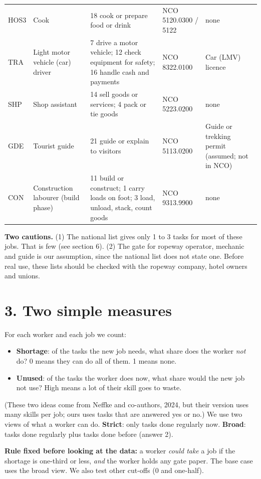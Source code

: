 \documentclass[11pt]{article}
\begin{document}
{\begin{longtable}{p{0.9cm}p{2.8cm}p{3.8cm}p{3.6cm}p{2.9cm}}
HOS3 & Cook & 18 cook or prepare food or drink & NCO 5120.0300 / 5122 & none \\
TRA & Light motor vehicle (car) driver & 7 drive a motor vehicle; 12 check equipment for safety; 16 handle cash and payments & NCO 8322.0100 & Car (LMV) licence \\
SHP & Shop assistant & 14 sell goods or services; 4 pack or tie goods & NCO 5223.0200 & none \\
GDE & Tourist guide & 21 guide or explain to visitors & NCO 5113.0200 & Guide or trekking permit (assumed; not in NCO) \\
CON & Construction labourer (build phase) & 11 build or construct; 1 carry loads on foot; 3 load, unload, stack, count goods & NCO 9313.9900 & none \\
\bottomrule
\end{longtable}
}

\textbf{Two cautions.} (1) The national list gives only 1 to 3 tasks for most of these jobs. That is few (see section 6). (2) The gate for ropeway operator, mechanic and guide is our assumption, since the national list does not state one.
Before real use, these lists should be checked with the ropeway company, hotel owners and unions.

\section*{3. Two simple measures}
For each worker and each job we count:
\begin{itemize}[leftmargin=1.2em,itemsep=2pt]
\item \textbf{Shortage}: of the tasks the new job needs, what share does the worker \emph{not} do? 0 means they can do all of them. 1 means none.
\item \textbf{Unused}: of the tasks the worker does now, what share would the new job not use? High means a lot of their skill goes to waste.
\end{itemize}
(These two ideas come from Neffke and co-authors, 2024, but their version uses many skills per job; ours uses tasks that are answered yes or no.)
We use two views of what a worker can do. \textbf{Strict}: only tasks done regularly now. \textbf{Broad}: tasks done regularly plus tasks done before (answer 2).

\textbf{Rule fixed before looking at the data:} a worker \emph{could take} a job if the shortage is one-third or less, \emph{and} the worker holds any gate paper. The base case uses the broad view.
We also test other cut-offs (0 and one-half).
\end{document}

